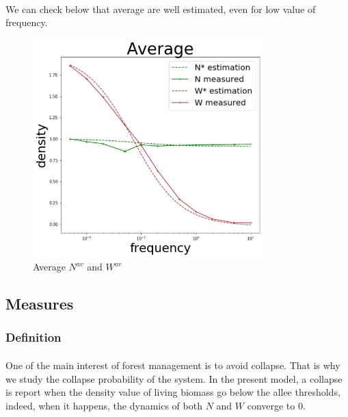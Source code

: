 \documentclass{article}
\begin{document}
\paragraph{}
We can check below that average are well estimated, even for low value of frequency.

\begin{figure}[h!]
\centering
\includegraphics[width=9cm]{average.png}
\caption{Average $N^{av}$ and $W^{av}$}
\end{figure}





\newpage
\subsection{Measures}


\subsubsection{Definition}

\paragraph{}
One of the main interest of forest management is to avoid collapse. That is why we study the collapse probability of the system. In the present model, a collapse is report when the density value of living biomass go below the allee thresholds, indeed, when it happens, the dynamics of both $N$ and $W$ converge to $0$.
\end{document}
